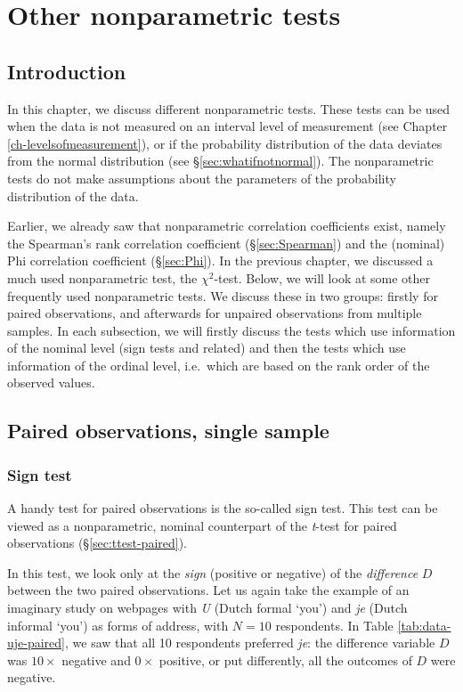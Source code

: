 \documentclass[
]{book}
\begin{document}
\chapter{Other nonparametric tests}\label{ch-other-nonpar-tests}

\section{Introduction}\label{sec:h17introduction}

In this chapter, we discuss different nonparametric tests.
These tests can be used when the data is not
measured on an interval level of measurement (see Chapter
\ref{ch-levelsofmeasurement}), or if the probability distribution of the
data deviates from the normal distribution (see
§\ref{sec:whatifnotnormal}). The nonparametric tests do not make
assumptions about the parameters of the probability distribution of the data.

Earlier, we already saw that nonparametric correlation coefficients exist,
namely the Spearman's rank correlation coefficient (§\ref{sec:Spearman})
and the (nominal) Phi correlation coefficient
(§\ref{sec:Phi}). In the previous chapter, we discussed
a much used nonparametric test, the \(\chi^2\)-test. Below, we will look at some other
frequently used nonparametric tests. We discuss these in two groups:
firstly for paired observations, and afterwards for unpaired observations from
multiple samples. In each subsection, we will firstly discuss the tests
which use information of the nominal level (sign tests and related) and
then the tests which use information of the ordinal level, i.e.~which are based on the
rank order of the observed values.

\section{Paired observations, single sample}\label{paired-observations-single-sample}

\subsection{Sign test}\label{sec:signtest}

A handy test for paired observations is the so-called sign test.
This test can be viewed as a nonparametric, nominal counterpart of
the \emph{t}-test for paired observations
(§\ref{sec:ttest-paired}).

In this test, we look only at the \emph{sign} (positive or negative)
of the \emph{difference} \(D\) between the two paired observations. Let us again
take the example of an imaginary study on webpages with
\emph{U} (Dutch formal `you') and \emph{je} (Dutch informal `you') as forms of address, with
\(N=10\) respondents. In Table \ref{tab:data-uje-paired}, we saw
that all 10 respondents preferred \emph{je}: the difference variable \(D\) was
\(10\times\) negative and \(0\times\) positive, or put differently, all the outcomes
of \(D\) were negative.
\end{document}
